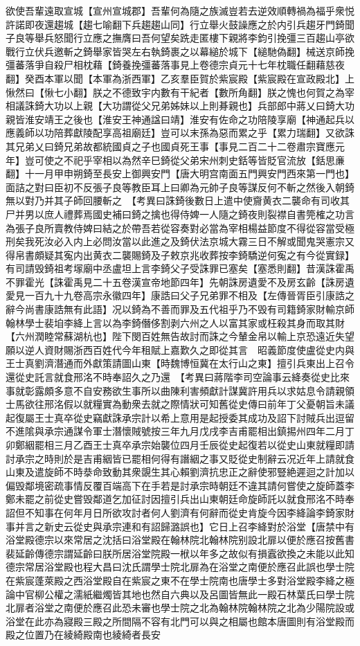 欲使吾輩遠取宣城【宣州宣城郡】吾輩何為隨之族滅豈若去逆效順轉禍為福乎衆悦許諾即夜還趨城【趨七喻翻下兵趨趨山同】行立舉火鼓譟應之於内引兵趨牙門錡聞子良等舉兵怒聞行立應之撫膺曰吾何望矣跣走匿樓下親將李鈞引挽彊三百趨山亭欲戰行立伏兵邀斬之錡舉家皆哭左右執錡裹之以幕縋於城下【縋馳偽翻】械送京師挽彊蕃落爭自殺尸相枕藉【錡養挽彊蕃落事見上卷德宗貞元十七年枕職任翻藉慈夜翻】癸酉本軍以聞【本軍為浙西軍】乙亥羣臣賀於紫宸殿【紫宸殿在宣政殿北】上愀然曰【愀七小翻】朕之不德致宇内數有干紀者【數所角翻】朕之愧也何賀之為宰相議誅錡大功以上親【大功謂從父兄弟姊妹以上則朞親也】兵部郎中蔣乂曰錡大功親皆淮安靖王之後也【淮安王神通諡曰靖】淮安有佐命之功陪陵享廟【神通起兵以應義師以功陪葬獻陵配享高祖廟廷】豈可以末孫為惡而累之乎【累力瑞翻】又欲誅其兄弟乂曰錡兄弟故都統國貞之子也國貞死王事【事見二百二十二卷肅宗寶應元年】豈可使之不祀乎宰相以為然辛巳錡從父弟宋州刺史銛等皆貶官流放【銛思亷翻】十一月甲申朔錡至長安上御興安門【唐大明宫南面五門興安門西來第一門也】面詰之對曰臣初不反張子良等教臣耳上曰卿為元帥子良等謀反何不斬之然後入朝錡無以對乃并其子師回腰斬之　【考異曰誅錡後數日上遣中使齎黄衣二襲命有司收其尸并男以庶人禮葬焉國史補曰錡之擒也得侍婢一人隨之錡夜則裂襟自書筦榷之功言為張子良所賣教侍婢曰結之於帶吾若從容奏對必當為宰相楊益節度不得從容當受極刑矣我死汝必入内上必問汝當以此進之及錡伏法京城大霧三日不解或聞鬼哭憲宗又得帛書頗疑其寃内出黄衣二襲賜錡及子敕京兆收葬按李錡驕逆何寃之有今從實録】有司請毁錡祖考塜廟中丞盧坦上言李錡父子受誅罪已塞矣【塞悉則翻】昔漢誅霍禹不罪霍光【誅霍禹見二十五卷漢宣帝地節四年】先朝誅房遺愛不及房玄齡【誅房遺愛見一百九十九卷高宗永徽四年】康誥曰父子兄弟罪不相及【左傳晉胥臣引康誥之辭今尚書康誥無有此語】况以錡為不善而罪及五代祖乎乃不毁有司籍錡家財輸京師翰林學士裴垍李絳上言以為李錡僭侈割剥六州之人以富其家或枉殺其身而取其財【六州潤睦常蘇湖杭也】陛下閔百姓無告故討而誅之今輦金帛以輸上京恐遠近失望願以逆人資財賜浙西百姓代今年租賦上嘉歎久之即從其言　昭義節度使盧從史内與王士真劉濟潛通而外獻策請圖山東【時魏博恒冀在太行山之東】擅引兵東出上召令還從史託言就食邢洺不時奉詔久之乃還　【考異曰蔣階李司空論事云絳奏從史比來事就彰露頗多意不自安務欲生事所以曲陳利害頻獻計謀冀許用兵以求姑息令請親領士馬欲往邢洺假以就糧實為動衆去就之際情狀可知舊從史傳曰前年丁父憂朝旨未議起復屬王士真卒從史竊獻誅承宗計以希上意用是起授委其成功及詔下討賊兵出逗留不進隂與承宗通謀令軍士潛懷賊號按三年九月戊戌李吉甫罷相出鎮掦州四年二月丁卯鄭絪罷相三月乙酉王士真卒承宗始襲位四月壬辰從史起復若以從史山東就糧即請討承宗之時則於是吉甫絪皆已罷相何得有譖絪之事又貶從史制辭云况近年上請就食山東及遣旋師不時㳟命致動其衆覬生其心賴劉濟抗忠正之辭使邪豎絶遲迴之計加以偏毁鄰境密疏事情反覆百端高下在手若是討承宗時朝廷不違其請何嘗使之旋師蓋李鄭未罷之前從史嘗毁鄰道乞加征討因擅引兵出山東朝廷命旋師託以就食邢洺不時奉詔但不知事在何年月日所欲攻討者何人劉濟有何辭而從史肯旋今因李絳論李錡家財事并言之新史云從史與承宗連和有詔歸潞誤也】它日上召李絳對於浴堂【唐禁中有浴堂殿德宗以來常居之沈括曰浴堂殿在翰林院北翰林院别設北扉以便於應召按舊書裴延齡傳德宗謂延齡曰朕所居浴堂院殿一栿以年多之故似有損蠧欲換之未能以此知德宗常居浴堂殿也程大昌曰沈氏謂學士院北扉為在浴堂之南便於應召此誤也學士院在紫宸蓬萊殿之西浴堂殿自在紫宸之東不在學士院南也唐學士多對浴堂殿李絳之極論中官柳公權之濡紙繼燭皆其地也然自六典以及呂圖皆無此一殿石林葉氏曰學士院北扉者浴堂之南便於應召此恐未審也學士院之北為翰林院翰林院之北為少陽院設或浴堂在此亦為寢殿三殿之所間隔不容有北門可以與之相屬也館本唐圖則有浴堂殿而殿之位置乃在綾綺殿南也綾綺者長安